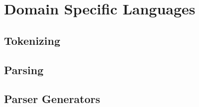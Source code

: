 \section{Domain Specific Languages}

\subsection{Tokenizing}


\subsection{Parsing}


\subsection{Parser Generators}

